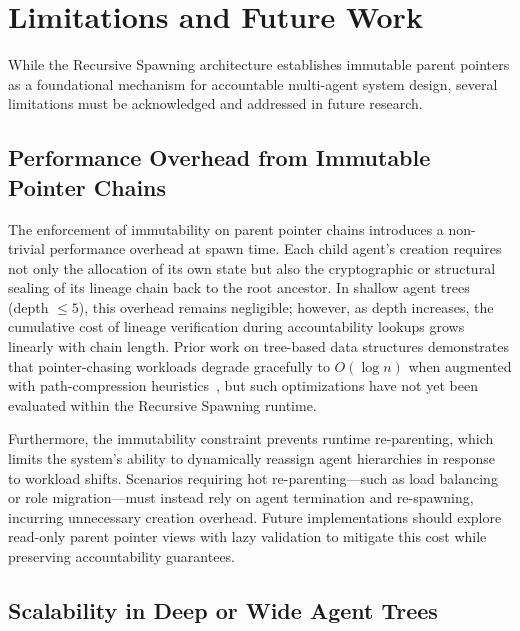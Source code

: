 
\section{Limitations and Future Work}
\label{sec:limitations}

While the Recursive Spawning architecture establishes immutable parent pointers as a foundational mechanism for accountable multi-agent system design, several limitations must be acknowledged and addressed in future research.

\subsection{Performance Overhead from Immutable Pointer Chains}
\label{sec:limitations:performance}

The enforcement of immutability on parent pointer chains introduces a non-trivial performance overhead at spawn time. Each child agent's creation requires not only the allocation of its own state but also the cryptographic or structural sealing of its lineage chain back to the root ancestor. In shallow agent trees (depth $\leq 5$), this overhead remains negligible; however, as depth increases, the cumulative cost of lineage verification during accountability lookups grows linearly with chain length. Prior work on tree-based data structures demonstrates that pointer-chasing workloads degrade gracefully to $O(\log n)$ when augmented with path-compression heuristics~\cite{silberschatz1998operating}, but such optimizations have not yet been evaluated within the Recursive Spawning runtime.

Furthermore, the immutability constraint prevents runtime re-parenting, which limits the system's ability to dynamically reassign agent hierarchies in response to workload shifts. Scenarios requiring hot re-parenting—such as load balancing or role migration—must instead rely on agent termination and re-spawning, incurring unnecessary creation overhead. Future implementations should explore read-only parent pointer views with lazy validation to mitigate this cost while preserving accountability guarantees.

\subsection{Scalability in Deep or Wide Agent Trees}
\label{sec:limitations:scalability}

